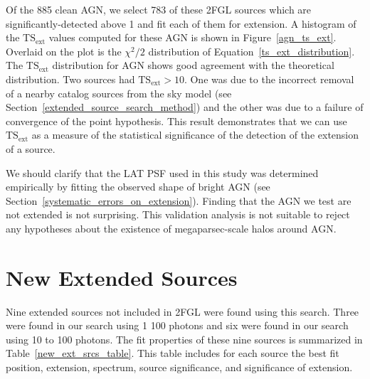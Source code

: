 \documentclass[12pt,preprint]{aastex}
\newcommand{\gev}{\text{GeV}\xspace}
\newcommand{\tsext}{{\ensuremath{\text{TS}_{\text{ext}}}}\xspace}
\begin{document}
Of the 885 clean AGN, we select 783 of these 2FGL sources which
are significantly-detected above 1 \gev and fit each of them for extension.
A histogram of the \tsext values computed for these AGN is
shown in Figure~\ref{agn_ts_ext}. Overlaid on the plot is the
$\chi^2/2$ distribution of Equation~\ref{ts_ext_distribution}.
The \tsext distribution for AGN shows good agreement with the
theoretical distribution.  Two sources had $\tsext>10$.  One was due
to the incorrect removal of a nearby catalog sources from
the sky model (see
Section~\ref{extended_source_search_method}) and the other was due to a
failure of convergence of the point hypothesis.  This result demonstrates
that we can use \tsext as a measure of the statistical significance of
the detection of the extension of a source.

We should clarify that the LAT PSF used in this study was determined
empirically by fitting the observed shape of bright AGN (see
Section~\ref{systematic_errors_on_extension}). Finding that the AGN we
test are not extended is not surprising.  This validation analysis is
not suitable to reject any hypotheses about the existence of megaparsec-scale
halos around AGN.

\section{New Extended Sources}
\label{new_ext_srcs_section}



Nine extended sources not included in 2FGL were found using this search.
Three were found in our search using 1 \gev 100 \gev photons and six were
found in our search using 10 \gev to 100 \gev photons.  The fit properties of
these nine sources is summarized in Table~\ref{new_ext_srcs_table}.
This table includes for each source the best fit position, extension,
spectrum, source significance, and significance of extension.
\end{document}
